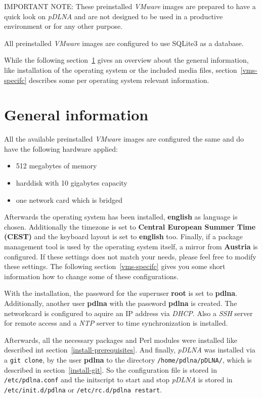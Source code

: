 \documentclass[a4paper,oneside,10pt]{report}
\newenvironment{colframeimportantnote}{%
  \begin{Sbox}
    \begin{minipage}{.99\columnwidth}
}{%
  \end{minipage}
  \end{Sbox}
  \begin{center}
    \fcolorbox{black}{Orange}{\TheSbox}
  \end{center}
}
\begin{document}
\begin{colframeimportantnote}
\textsc{IMPORTANT NOTE:} These preinstalled {\em VMware} images are prepared to have a quick look on {\em pDLNA} and are not designed to be used in a productive environment or for any other purpose.
\end{colframeimportantnote}

All preinstalled {\em VMware} images are configured to use SQLite3 as a database.

While the following section~\ref{vms-general} gives an overview about the general information, like installation of the operating system or the included media files, section~\ref{vms-specifc} describes some per operating system relevant information.

\section{General information}
\label{vms-general}

All the available preinstalled {\em VMware} images are configured the same and do have the following hardware applied:
\begin{itemize}
	\item 512 megabytes of memory
	\item harddisk with 10 gigabytes capacity
	\item one network card which is bridged
\end{itemize}

Afterwards the operating system has been installed, \textbf{english} as language is chosen. Additionally the timezone is set to \textbf{Central European Summer Time (CEST)} and the keyboard layout is set to \textbf{english} too. Finally, if a package management tool is used by the operating system itself, a mirror from \textbf{Austria} is configured. If these settings does not match your needs, please feel free to modify these settings. The following section~\ref{vms-specifc} gives you some short information how to change some of these configurations.

With the installation, the password for the superuser \textbf{root} is set to \textbf{pdlna}. Additionally, another user \textbf{pdlna} with the password \textbf{pdlna} is created. The networkcard is configured to aquire an IP address via {\em DHCP}. Also a {\em SSH} server for remote access and a {\em NTP} server to time synchronization is installed.

Afterwards, all the necessary packages and Perl modules were installed like described int section~\ref{install-prerequisites}. And finally, {\em pDLNA} was installed via a \verb|git clone|, by the user \textbf{pdlna} to the directory \verb|/home/pdlna/pDLNA/|, which is described in section~\ref{install-git}. So the configuration file is stored in \verb|/etc/pdlna.conf| and the initscript to start and stop {\em pDLNA} is stored in \verb|/etc/init.d/pdlna| or \verb|/etc/rc.d/pdlna restart|.
\end{document}

